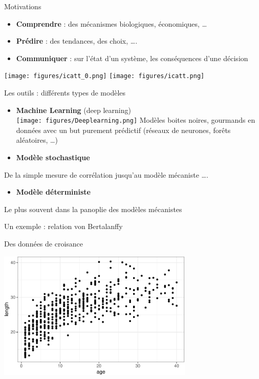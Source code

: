 \documentclass[10pt,ignorenonframetext,]{beamer}
\providecommand{\tightlist}{%
  \setlength{\itemsep}{0pt}\setlength{\parskip}{0pt}}
\begin{document}
\begin{frame}{Motivations}

\begin{itemize}
\item
  \textbf{Comprendre} : des mécanismes biologiques, économiques,
  \ldots{}
\item
  \textbf{Prédire} : des tendances, des choix, \ldots{}.
\item
  \textbf{Communiquer} : sur l'état d'un système, les conséquences d'une
  décision
\end{itemize}

\texttt{[image: figures/icatt\_0.png]}
\texttt{[image: figures/icatt.png]}

\end{frame}

\begin{frame}{Les outils : différents types de modèles}

\begin{itemize}
\item
  \textbf{Machine Learning} (deep learning)\\
  \texttt{[image: figures/Deeplearning.png]} Modèles
  boites noires, gourmands en données avec un but purement prédictif
  (réseaux de neurones, forêts aléatoires, \ldots{})
\item
  \textbf{Modèle stochastique}
\end{itemize}

De la simple mesure de corrélation jusqu'au modèle mécaniste \ldots{}.

\begin{itemize}
\tightlist
\item
  \textbf{Modèle déterministe}
\end{itemize}

Le plus souvent dans la panoplie des modèles mécanistes

\end{frame}

\begin{frame}{Un exemple : relation von Bertalanffy}

Des données de croisance \scriptsize

\begin{center}\includegraphics[width=0.7\textwidth]{figures/unnamed-chunk-1-1} \end{center}

\normalsize

\end{frame}
\end{document}
